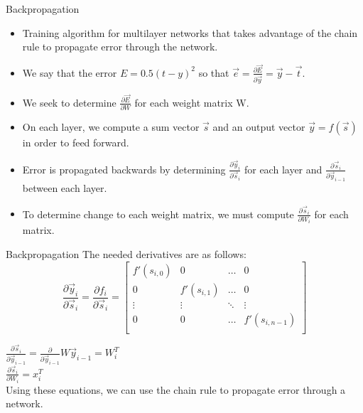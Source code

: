 \documentclass[11pt]{beamer}
\begin{document}
\begin{frame}{Backpropagation}
\begin{itemize}
    \item Training algorithm for multilayer networks that takes advantage of the chain rule to propagate error through the network. \\
    \item We say that the error $E = 0.5(t - y)^2$ so that $\vec{e} = \frac{\partial \vec{E}}{\partial \vec{y}} = \vec{y} - \vec{t}$.
    \item We seek to determine $\frac{\partial \vec{E}}{\partial W}$ for each weight matrix W. \\
    \item On each layer, we compute a sum vector $\vec{s}$ and an output vector $\vec{y} = f(\vec{s})$ in order to feed forward. \\
    \item Error is propagated backwards by determining $\frac{\partial \vec{y}_i}{\partial \vec{s}_i}$ for each layer and $\frac{\partial \vec{s}_i}{\partial \vec{y}_{i-1}}$ between each layer. \\
    \item To determine change to each weight matrix, we must compute $\frac{\partial \vec{s}_i}{\partial W_i}$ for each matrix.
\end{itemize}
\end{frame}

\begin{frame}{Backpropagation}
The needed derivatives are as follows: \\
\[
\frac{\partial \vec{y}_i}{\partial \vec{s}_i} = \frac{\partial f_i}{\partial \vec{s}_i} = 
\begin{bmatrix}
    f'(s_{i,0}) & 0            & \dots   & 0      \\
    0           & f'(s_{i,1})  & \dots   & 0      \\
    \vdots      & \vdots       & \ddots  & \vdots \\
    0           & 0            & \dots   & f'(s_{i,n-1}) \\
\end{bmatrix}
\]

$\frac{\partial \vec{s}_i}{\partial \vec{y}_{i-1}} = \frac{\partial}{\partial \vec{y}_{i-1}} W\vec{y}_{i-1} = W_i^T$ \\
$\frac{\partial \vec{s}_i}{\partial W_i} = x_i^T$ \\
Using these equations, we can use the chain rule to propagate error through a network.
\end{frame}
\end{document}
